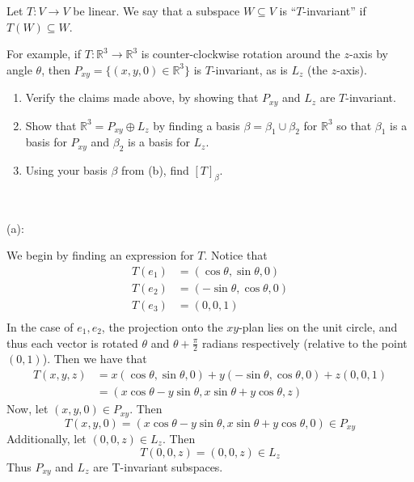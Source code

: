 \documentclass{eh-homework}
\begin{document}
    \newpage
    \begin{question}{11}
        Let \( T : V \to V \) be linear. We say that a subspace \( W \subseteq V \) is ``\( T \)-invariant'' if \( T(W) \subseteq W \).

        For example, if \( T : \mathbb{R}^3 \to \mathbb{R}^3 \) is counter-clockwise rotation around the \( z \)-axis by angle \( \theta \), then \( P_{xy} = \{(x, y, 0) \in \mathbb{R}^3\} \) is \( T \)-invariant, as is \( L_z \) (the \( z \)-axis).

        \begin{enumerate}[label=(\alph*)]
            \item Verify the claims made above, by showing that \( P_{xy} \) and \( L_z \) are \( T \)-invariant.
            \item Show that \( \mathbb{R}^3 = P_{xy} \oplus L_z \) by finding a basis \( \beta = \beta_1 \cup \beta_2 \) for \( \mathbb{R}^3 \) so that \( \beta_1 \) is a basis for \( P_{xy} \) and \( \beta_2 \) is a basis for \( L_z \).
            \item Using your basis \( \beta \) from (b), find \( [T]_\beta \).
        \end{enumerate}
        \tcblower
        \ 

        (a):

        We begin by finding an expression for \(T\). Notice that
        \begin{align*}
            T(e_1) &= (\cos \theta , \sin \theta , 0) \\
            T(e_2) &= (-\sin \theta, \cos \theta, 0) \\
            T(e_3) &= (0,0,1) \\
        \end{align*}
        In the case of \(e_1, e_2\), the projection onto the \(xy\)-plan lies on the unit circle, and thus each vector is rotated \(\theta\) and \(\theta + \frac{\pi}{2}\) radians respectively (relative to the point \((0,1)\)). Then we have that
        \begin{align*}
            T(x,y,z) &= x(\cos \theta , \sin \theta , 0) + y(-\sin \theta , \cos \theta , 0) + z(0,0,1) \\
            &= (x\cos \theta - y\sin \theta , x\sin \theta +y\cos \theta , z)
        \end{align*}
        Now, let \((x,y,0) \in P_{xy}\). Then
        \[
            T(x,y,0) = (x \cos \theta - y\sin \theta , x\sin \theta + y\cos \theta , 0) \in P_{xy}
        \]
        Additionally, let \((0,0,z) \in L_z\). Then
        \[
            T(0,0,z) = (0,0,z) \in L_z
        \]
        Thus \(P_{xy}\) and \(L_z\) are T-invariant subspaces.


\end{question}
\end{document}
